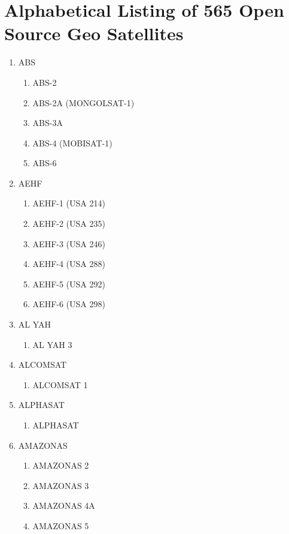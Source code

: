 % 

\section{Alphabetical Listing of 565 Open Source Geo Satellites}

\begin{multicols}{2}
\begin{enumerate}
  \item ABS
  \begin{enumerate}
    \item ABS-2
    \item ABS-2A (MONGOLSAT-1)
    \item ABS-3A
    \item ABS-4 (MOBISAT-1)
    \item ABS-6
  \end{enumerate}
  \item AEHF
  \begin{enumerate}
    \item AEHF-1 (USA 214)
    \item AEHF-2 (USA 235)
    \item AEHF-3 (USA 246)
    \item AEHF-4 (USA 288)
    \item AEHF-5 (USA 292)
    \item AEHF-6 (USA 298)
  \end{enumerate}
  \item AL YAH
  \begin{enumerate}
    \item AL YAH 3
  \end{enumerate}
  \item ALCOMSAT
  \begin{enumerate}
    \item ALCOMSAT 1
  \end{enumerate}
  \item ALPHASAT
  \begin{enumerate}
    \item ALPHASAT
  \end{enumerate}
  \item AMAZONAS
  \begin{enumerate}
    \item AMAZONAS 2
    \item AMAZONAS 3
    \item AMAZONAS 4A
    \item AMAZONAS 5
  \end{enumerate}

\end{enumerate}
\end{multicols}

